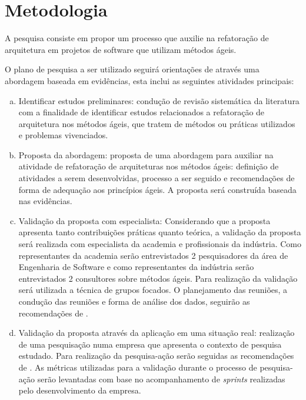 \chapter{Metodologia}

A pesquisa consiste em propor um processo que auxilie na refatoração de arquitetura em projetos de software que utilizam métodos ágeis.

O plano de pesquisa a ser utilizado seguirá orientações de \cite{dias2010developing} através uma abordagem baseada em evidências, esta inclui as seguintes atividades principais:
\begin{enumerate}[(a)]

\item Identificar estudos preliminares: condução de revisão sistemática da literatura com a finalidade de identificar estudos relacionados a refatoração de arquitetura nos métodos ágeis, que tratem de métodos ou práticas utilizados e problemas vivenciados.

\item Proposta da abordagem: proposta de uma abordagem para auxiliar na atividade de refatoração de arquiteturas nos métodos ágeis: definição de atividades a serem desenvolvidas, processo a ser seguido e recomendações de forma de adequação aos princípios ágeis. A proposta será construída baseada nas evidências. 

\item Validação da proposta com especialista: Considerando que a proposta apresenta tanto contribuições práticas quanto teórica, a validação da proposta será realizada com especialista da academia e profissionais da indústria. Como representantes da academia serão entrevistados 2 pesquisadores da área de Engenharia de Software e como representantes da indústria serão entrevistados 2 consultores sobre métodos ágeis. Para realização da validação será utilizada a técnica de grupos focados. O planejamento das reuniões, a condução das reuniões e forma de análise dos dados, seguirão as recomendações de \cite{ribeiro2003gruposfocados}.

\item Validação da proposta através da aplicação em uma situação real: realização de uma pesquisação numa empresa que apresenta o contexto de pesquisa estudado. Para realização da pesquisa-ação serão seguidas as recomendações de \cite{dos2008colaboraccao}. As métricas utilizadas para a validação durante o processo de pesquisa-ação serão levantadas com base no acompanhamento de \textit{sprints} realizadas pelo desenvolvimento da empresa.


\end{enumerate}
